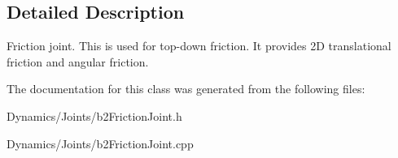 \subsection{Detailed Description}
Friction joint. This is used for top-\/down friction. It provides 2D translational friction and angular friction. 

The documentation for this class was generated from the following files\+:\begin{DoxyCompactItemize}
\item 
Dynamics/\+Joints/b2\+Friction\+Joint.\+h\item 
Dynamics/\+Joints/b2\+Friction\+Joint.\+cpp\end{DoxyCompactItemize}
